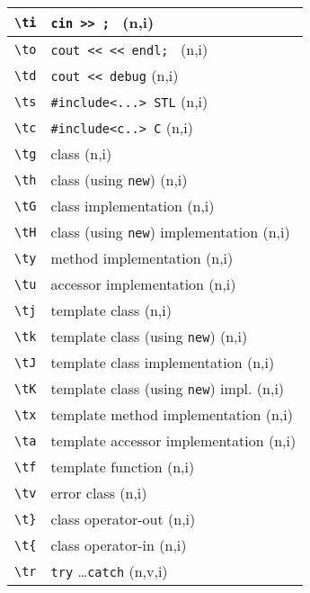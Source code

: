 \documentclass[oneside,11pt,landscape,DIV16]{scrartcl}
\begin{document}
\begin{multicols}{3}
\begin{center}
\begin{tabular}[]{|p{12mm}|p{60mm}|}
\hline \verb'\ti'   & \verb'cin >> ; '                \hfill (n,i)   \\
\hline \verb'\to'   & \verb'cout << << endl; '                \hfill (n,i)   \\
\hline \verb'\td'   & \verb'cout << debug'                    \hfill (n,i)       \\
\hline \verb'\ts'   & \verb$#include<...> STL$                \hfill (n,i)   \\
\hline \verb'\tc'   & \verb$#include<c..> C$                  \hfill (n,i)   \\
\hline \verb'\tg'   & class                                   \hfill (n,i)   \\
\hline \verb'\th'   & class (using \verb'new')                \hfill (n,i)   \\
\hline \verb'\tG'   & class  implementation                   \hfill (n,i)   \\
\hline \verb'\tH'   & class (using \verb'new') implementation \hfill (n,i)   \\
\hline \verb'\ty'   & method implementation                   \hfill (n,i)   \\
\hline \verb'\tu'   & accessor implementation                 \hfill (n,i)   \\
\hline \verb'\tj'   & template class                          \hfill (n,i)   \\
\hline \verb'\tk'   & template class (using \verb'new')       \hfill (n,i)   \\
\hline \verb'\tJ'   & template class  implementation          \hfill (n,i)   \\
\hline \verb'\tK'   & template class (using \verb'new') impl. \hfill (n,i)   \\
\hline \verb'\tx'   & template method implementation          \hfill (n,i)   \\
\hline \verb'\ta'   & template accessor implementation        \hfill (n,i)   \\
\hline \verb'\tf'   & template function                       \hfill (n,i)   \\
\hline \verb'\tv'   & error class                             \hfill (n,i)   \\
\hline \verb'\t}'   & class operator-out                      \hfill (n,i)   \\
\hline \verb'\t{'   & class operator-in                       \hfill (n,i)   \\
\hline \verb'\tr'   & \verb'try' \dots \verb'catch'           \hfill (n,v,i) \\

\end{tabular}
\end{center}
\end{multicols}
\end{document}
